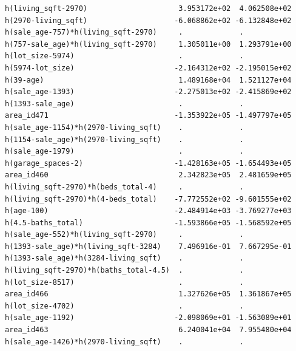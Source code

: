 \documentclass[
]{article}
\begin{document}
\begin{verbatim}
h(living_sqft-2970)                     3.953172e+02  4.062508e+02
h(2970-living_sqft)                    -6.068862e+02 -6.132848e+02
h(sale_age-757)*h(living_sqft-2970)     .             .           
h(757-sale_age)*h(living_sqft-2970)     1.305011e+00  1.293791e+00
h(lot_size-5974)                        .             .           
h(5974-lot_size)                       -2.164312e+02 -2.195015e+02
h(39-age)                               1.489168e+04  1.521127e+04
h(sale_age-1393)                       -2.275013e+02 -2.415869e+02
h(1393-sale_age)                        .             .           
area_id471                             -1.353922e+05 -1.497797e+05
h(sale_age-1154)*h(2970-living_sqft)    .             .           
h(1154-sale_age)*h(2970-living_sqft)    .             .           
h(sale_age-1979)                        .             .           
h(garage_spaces-2)                     -1.428163e+05 -1.654493e+05
area_id460                              2.342823e+05  2.481659e+05
h(living_sqft-2970)*h(beds_total-4)     .             .           
h(living_sqft-2970)*h(4-beds_total)    -7.772552e+02 -9.601555e+02
h(age-100)                             -2.484914e+03 -3.769277e+03
h(4.5-baths_total)                     -1.593866e+05 -1.568592e+05
h(sale_age-552)*h(living_sqft-2970)     .             .           
h(1393-sale_age)*h(living_sqft-3284)    7.496916e-01  7.667295e-01
h(1393-sale_age)*h(3284-living_sqft)    .             .           
h(living_sqft-2970)*h(baths_total-4.5)  .             .           
h(lot_size-8517)                        .             .           
area_id466                              1.327626e+05  1.361867e+05
h(lot_size-4702)                        .             .           
h(sale_age-1192)                       -2.098069e+01 -1.563089e+01
area_id463                              6.240041e+04  7.955480e+04
h(sale_age-1426)*h(2970-living_sqft)    .             .           
                                                                  

\end{verbatim}
\end{document}
